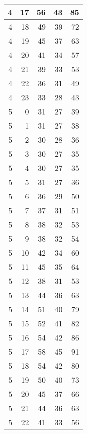 \begin{longtable}{|r|r|r|r|r|}
    4     & 17    & 56    & 43    & 85 \\\hline
    4     & 18    & 49    & 39    & 72 \\\hline
    4     & 19    & 45    & 37    & 63 \\\hline
    4     & 20    & 41    & 34    & 57 \\\hline
    4     & 21    & 39    & 33    & 53 \\\hline
    4     & 22    & 36    & 31    & 49 \\\hline
    4     & 23    & 33    & 28    & 43 \\\hline
    5     & 0     & 31    & 27    & 39 \\\hline
    5     & 1     & 31    & 27    & 38 \\\hline
    5     & 2     & 30    & 28    & 36 \\\hline
    5     & 3     & 30    & 27    & 35 \\\hline
    5     & 4     & 30    & 27    & 35 \\\hline
    5     & 5     & 31    & 27    & 36 \\\hline
    5     & 6     & 36    & 29    & 50 \\\hline
    5     & 7     & 37    & 31    & 51 \\\hline
    5     & 8     & 38    & 32    & 53 \\\hline
    5     & 9     & 38    & 32    & 54 \\\hline
    5     & 10    & 42    & 34    & 60 \\\hline
    5     & 11    & 45    & 35    & 64 \\\hline
    5     & 12    & 38    & 31    & 53 \\\hline
    5     & 13    & 44    & 36    & 63 \\\hline
    5     & 14    & 51    & 40    & 79 \\\hline
    5     & 15    & 52    & 41    & 82 \\\hline
    5     & 16    & 54    & 42    & 86 \\\hline
    5     & 17    & 58    & 45    & 91 \\\hline
    5     & 18    & 54    & 42    & 80 \\\hline
    5     & 19    & 50    & 40    & 73 \\\hline
    5     & 20    & 45    & 37    & 66 \\\hline
    5     & 21    & 44    & 36    & 63 \\\hline
    5     & 22    & 41    & 33    & 56 \\\hline

\end{longtable}
